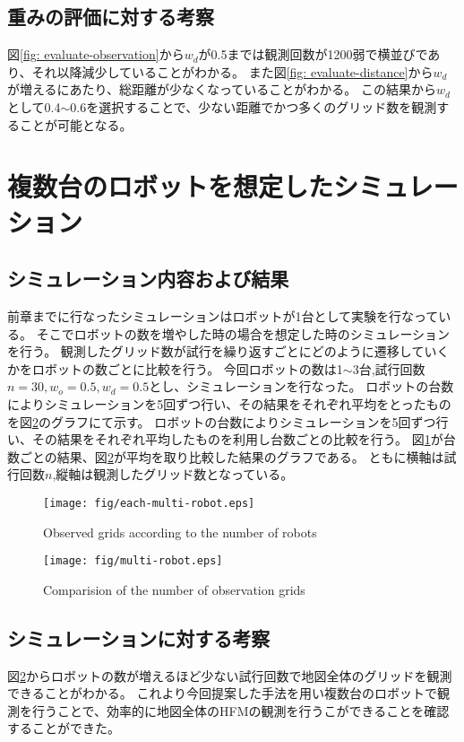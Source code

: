\documentclass{jsarticle}
\begin{document}
\subsection{重みの評価に対する考察}
図\ref{fig: evaluate-observation}から$w_d$が0.5までは観測回数が1200弱で横並びであり、それ以降減少していることがわかる。
また図\ref{fig: evaluate-distance}から$w_d$が増えるにあたり、総距離が少なくなっていることがわかる。
この結果から$w_d$として0.4$\sim$0.6を選択することで、少ない距離でかつ多くのグリッド数を観測することが可能となる。

\section{複数台のロボットを想定したシミュレーション}
\subsection{シミュレーション内容および結果}

前章までに行なったシミュレーションはロボットが1台として実験を行なっている。
そこでロボットの数を増やした時の場合を想定した時のシミュレーションを行う。
観測したグリッド数が試行を繰り返すごとにどのように遷移していくかをロボットの数ごとに比較を行う。
今回ロボットの数は1$\sim$3台,試行回数$n=30,w_o=0.5,w_d=0.5$とし、シミュレーションを行なった。
ロボットの台数によりシミュレーションを5回ずつ行い、その結果をそれぞれ平均をとったものを図\ref{fig: multirobot}のグラフにて示す。
ロボットの台数によりシミュレーションを5回ずつ行い、その結果をそれぞれ平均したものを利用し台数ごとの比較を行う。
図\ref{fig: each-multirobot}が台数ごとの結果、図\ref{fig: multirobot}が平均を取り比較した結果のグラフである。
ともに横軸は試行回数$n$,縦軸は観測したグリッド数となっている。

\begin{figure}[tbh]
 \centering
  \texttt{[image: fig/each-multi-robot.eps]}
  \vspace*{-4mm}
  \caption{Observed grids according to the number of robots}
  \label{fig: each-multirobot}
\end{figure}

\begin{figure}[tbh]
 \centering
  \texttt{[image: fig/multi-robot.eps]}
  \vspace*{-4mm}
  \caption{Comparision of  the number of observation grids}
  \label{fig: multirobot}
\end{figure}


\subsection{シミュレーションに対する考察}
図\ref{fig: multirobot}からロボットの数が増えるほど少ない試行回数で地図全体のグリッドを観測できることがわかる。
これより今回提案した手法を用い複数台のロボットで観測を行うことで、効率的に地図全体のHFMの観測を行うこができることを確認することができた。
\end{document}
